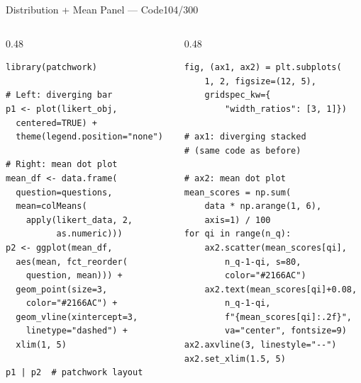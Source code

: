 \documentclass[10pt]{beamer}
\newcommand{\smark}[1]{\hfill{\scriptsize\color{codegray}#1}}
\begin{document}
\begin{frame}[fragile]{Distribution + Mean Panel --- Code}\smark{104/300}
\begin{columns}[T]
\begin{column}{0.48\textwidth}
\begin{lstlisting}[style=Rstyle]
library(patchwork)

# Left: diverging bar
p1 <- plot(likert_obj,
  centered=TRUE) +
  theme(legend.position="none")

# Right: mean dot plot
mean_df <- data.frame(
  question=questions,
  mean=colMeans(
    apply(likert_data, 2,
          as.numeric)))
p2 <- ggplot(mean_df,
  aes(mean, fct_reorder(
    question, mean))) +
  geom_point(size=3,
    color="#2166AC") +
  geom_vline(xintercept=3,
    linetype="dashed") +
  xlim(1, 5)

p1 | p2  # patchwork layout
\end{lstlisting}
\end{column}
\begin{column}{0.48\textwidth}
\begin{lstlisting}[style=Pystyle]
fig, (ax1, ax2) = plt.subplots(
    1, 2, figsize=(12, 5),
    gridspec_kw={
        "width_ratios": [3, 1]})

# ax1: diverging stacked
# (same code as before)

# ax2: mean dot plot
mean_scores = np.sum(
    data * np.arange(1, 6),
    axis=1) / 100
for qi in range(n_q):
    ax2.scatter(mean_scores[qi],
        n_q-1-qi, s=80,
        color="#2166AC")
    ax2.text(mean_scores[qi]+0.08,
        n_q-1-qi,
        f"{mean_scores[qi]:.2f}",
        va="center", fontsize=9)
ax2.axvline(3, linestyle="--")
ax2.set_xlim(1.5, 5)
\end{lstlisting}
\end{column}
\end{columns}
\end{frame}
\end{document}
